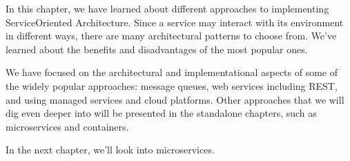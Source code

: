 In this chapter, we have learned about different approaches to implementing ServiceOriented Architecture. Since a service may interact with its environment in different ways, there are many architectural patterns to choose from. We've learned about the benefits and disadvantages of the most popular ones.

We have focused on the architectural and implementational aspects of some of the widely popular approaches: message queues, web services including REST, and using managed services and cloud platforms. Other approaches that we will dig even deeper into will be presented in the standalone chapters, such as microservices and containers.

In the next chapter, we'll look into microservices.